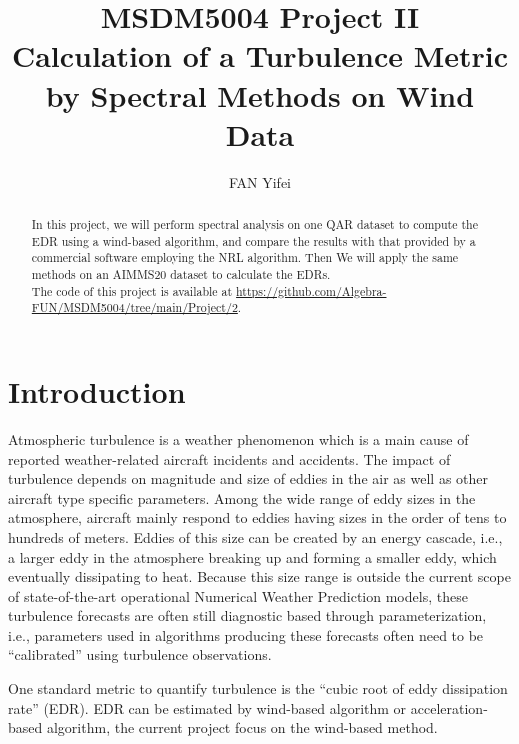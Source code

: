 \documentclass[runningheads]{llncs}
\begin{document}
\title{
    MSDM5004 Project II\\
    Calculation of a Turbulence Metric by Spectral Methods on Wind Data}
\author{FAN Yifei}
\maketitle

\begin{abstract}
    In this project, we will perform spectral analysis on one QAR dataset to compute the EDR using a wind-based algorithm, 
    and compare the results with that provided by a commercial software employing the NRL algorithm. 
    Then We will apply the same methods on an AIMMS20 dataset to calculate the EDRs.\\
    The code of this project is available at \url{https://github.com/Algebra-FUN/MSDM5004/tree/main/Project/2}.
\end{abstract}

\section{Introduction}

Atmospheric turbulence is a weather phenomenon which is a main cause of reported weather-related aircraft incidents and accidents. The impact of turbulence depends on magnitude and size of eddies in the air as well as other aircraft type specific parameters.
Among the wide range of eddy sizes in the atmosphere, aircraft mainly respond to eddies having sizes in the order of tens to hundreds of meters. Eddies of this size can be created by an energy cascade, i.e., a larger eddy in the atmosphere breaking up and forming a smaller eddy, which eventually dissipating to heat. Because this size range is outside the current scope of state-of-the-art operational Numerical Weather Prediction models, these turbulence forecasts are often still diagnostic based through parameterization, i.e., parameters used in algorithms producing these forecasts often need to be “calibrated” using turbulence observations.

One standard metric to quantify turbulence is the “cubic root of eddy dissipation rate” (EDR). 
EDR can be estimated by wind-based algorithm or acceleration-based algorithm, the current project focus on the wind-based method.
\end{document}
